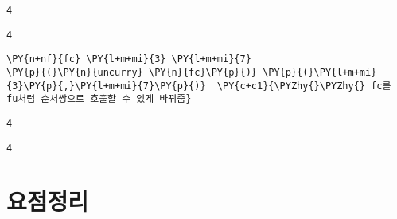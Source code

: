     
    \begin{Verbatim}[commandchars=\\\{\}]
4
    \end{Verbatim}

    
    
    \begin{Verbatim}[commandchars=\\\{\}]
4
    \end{Verbatim}

    
    \begin{tcolorbox}[breakable, size=fbox, boxrule=1pt, pad at break*=1mm,colback=cellbackground, colframe=cellborder, top=.75ex]
\begin{Verbatim}[commandchars=\\\{\}]
\PY{n+nf}{fc} \PY{l+m+mi}{3} \PY{l+m+mi}{7}
\PY{p}{(}\PY{n}{uncurry} \PY{n}{fc}\PY{p}{)} \PY{p}{(}\PY{l+m+mi}{3}\PY{p}{,}\PY{l+m+mi}{7}\PY{p}{)}  \PY{c+c1}{\PYZhy{}\PYZhy{} fc를 fu처럼 순서쌍으로 호출할 수 있게 바꿔줌}
\end{Verbatim}
\end{tcolorbox}

    
    \begin{Verbatim}[commandchars=\\\{\}]
4
    \end{Verbatim}

    
    
    \begin{Verbatim}[commandchars=\\\{\}]
4
    \end{Verbatim}

    
    \section*{요점정리}

